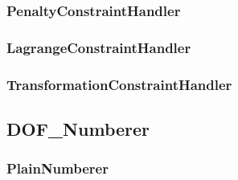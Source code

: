 \documentclass[12pt]{article}
\begin{document}
\pagebreak \subsubsection{PenaltyConstraintHandler}


\pagebreak \subsubsection{LagrangeConstraintHandler}


\pagebreak \subsubsection{TransformationConstraintHandler}


\pagebreak \subsection{DOF\_Numberer}


\pagebreak \subsubsection{PlainNumberer}

\end{document}
